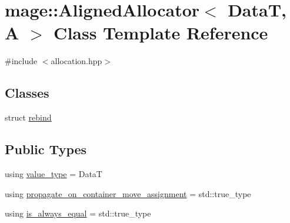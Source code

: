 \hypertarget{classmage_1_1_aligned_allocator}{}\section{mage\+:\+:Aligned\+Allocator$<$ DataT, A $>$ Class Template Reference}
\label{classmage_1_1_aligned_allocator}


{\ttfamily \#include $<$allocation.\+hpp$>$}

\subsection*{Classes}
\begin{DoxyCompactItemize}
\item 
struct \mbox{\hyperlink{structmage_1_1_aligned_allocator_1_1rebind}{rebind}}
\end{DoxyCompactItemize}
\subsection*{Public Types}
\begin{DoxyCompactItemize}
\item 
using \mbox{\hyperlink{classmage_1_1_aligned_allocator_a6299143bce3deec35202884eedfa5065}{value\+\_\+type}} = DataT
\item 
using \mbox{\hyperlink{classmage_1_1_aligned_allocator_abca6b6297d4362cb1811015587a13f74}{propagate\+\_\+on\+\_\+container\+\_\+move\+\_\+assignment}} = std\+::true\+\_\+type
\item 
using \mbox{\hyperlink{classmage_1_1_aligned_allocator_a8e5be98ed33a6dd84f72b75ee07753e7}{is\+\_\+always\+\_\+equal}} = std\+::true\+\_\+type
\end{DoxyCompactItemize}
